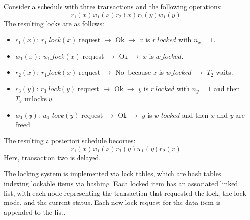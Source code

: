 \begin{example}
    Consider a schedule with three transactions and the following operations:
    \[r_1(x)w_1(x)r_2(x)r_3(y)w_1(y)\]
    The resulting locks are as follows:
    \begin{itemize}
        \item $r_1(x)$: $r_1\_lock(x)$ request $\rightarrow$ Ok $\rightarrow$ $x$ is $r\_locked$ with $n_x=1$. 
        \item $w_1(x)$: $w_1\_lock(x)$ request $\rightarrow$ Ok $\rightarrow$ $x$ is $w\_locked$. 
        \item $r_2(x)$: $r_1\_lock(x)$ request $\rightarrow$ No, because $x$ is $w\_locked$ $\rightarrow$ $T_2$ waits. 
        \item $r_3(y)$: $r_3\_lock(y)$ request $\rightarrow$ Ok $\rightarrow$ $y$ is $r\_locked$ with $n_y=1$ and then $T_3$ unlocks $y$. 
        \item $w_1(y)$: $w_1\_lock(y)$ request $\rightarrow$ Ok $\rightarrow$ $y$ is $w\_locked$ and then $x$ and $y$ are freed. 
    \end{itemize}
    The resulting a posteriori schedule becomes:
    \[r_1(x)w_1(x)r_3(y)w_1(y)r_2(x)\]
    Here, transaction two is delayed. 
\end{example}
The locking system is implemented via lock tables, which are hash tables indexing lockable items via hashing. 
Each locked item has an associated linked list, with each node representing the transaction that requested the lock, the lock mode, and the current status. 
Each new lock request for the data item is appended to the list.